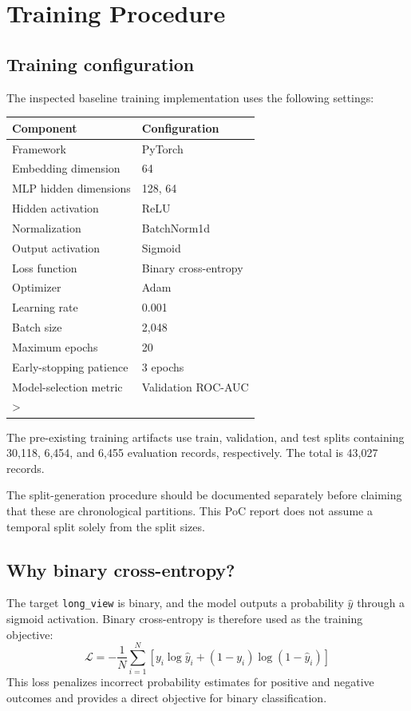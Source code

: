 \documentclass[11pt,a4paper]{article}
\begin{document}
\section{Training Procedure}
\subsection{Training configuration}
The inspected baseline training implementation uses the following settings:
\begin{table}[htbp]
\centering
\begin{tabular}{ll}
\toprule
\textbf{Component} & \textbf{Configuration} \\
\midrule
Framework & PyTorch \\
Embedding dimension & 64 \\
MLP hidden dimensions & 128, 64 \\
Hidden activation & ReLU \\
Normalization & BatchNorm1d \\
Output activation & Sigmoid \\
Loss function & Binary cross-entropy \\
Optimizer & Adam \\
Learning rate & 0.001 \\
Batch size & 2,048 \\
Maximum epochs & 20 \\
Early-stopping patience & 3 epochs \\
Model-selection metric & Validation ROC-AUC \\
\bottomrule>
\end{tabular}
\end{table}

The pre-existing training artifacts use train, validation, and test splits containing 30,118, 6,454, and 6,455 evaluation records, respectively. The total is 43,027 records.

The split-generation procedure should be documented separately before claiming that these are chronological partitions. This PoC report does not assume a temporal split solely from the split sizes.

\subsection{Why binary cross-entropy?}
The target \texttt{long\_view} is binary, and the model outputs a probability $\hat{y}$ through a sigmoid activation. Binary cross-entropy is therefore used as the training objective:
\begin{equation}
\mathcal{L} = -\frac{1}{N} \sum_{i=1}^{N} \left[ y_i \log \hat{y}_i + (1 - y_i) \log (1 - \hat{y}_i) \right]
\end{equation}
This loss penalizes incorrect probability estimates for positive and negative outcomes and provides a direct objective for binary classification.
\end{document}
